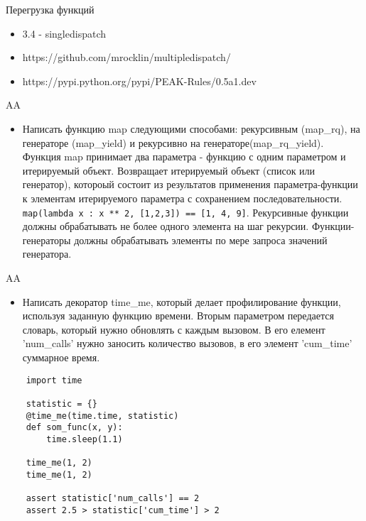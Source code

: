 \documentclass{article}
\begin{document}
\begin{center} Перегрузка функций \end{center}
\begin{itemize}
    \item 3.4 - singledispatch
    \item https://github.com/mrocklin/multipledispatch/
    \item https://pypi.python.org/pypi/PEAK-Rules/0.5a1.dev
\end{itemize}
\newpage

\begin{center} AA \end{center}
\begin{itemize}
    \item Написать функцию map следующими способами: рекурсивным (map\_rq),
        на генераторе (map\_yield) и рекурсивно на генераторе(map\_rq\_yield).
        Функция map принимает два параметра - функцию с одним параметром и итерируемый объект.
        Возвращает итерируемый объект (список или генератор), котороый состоит из результатов
        применения параметра-функции к элементам итерируемого параметра с сохранением последовательности.
        \lstinline!map(lambda x : x ** 2, [1,2,3]) == [1, 4, 9]!.
        Рекурсивные функции должны обрабатывать не более одного элемента на шаг рекурсии.
        Функции-генераторы должны обрабатывать элементы по мере запроса значений генератора.
\end{itemize}
\newpage

\begin{center} AA \end{center}
\begin{itemize}
    \item Написать декоратор time\_me, который делает профилирование функции,
        используя заданную функцию времени. Вторым параметром передается словарь,
        который нужно обновлять с каждым вызовом. В его елемент 'num\_calls' нужно
        заносить количество вызовов, в его элемент 'cum\_time' суммарное время.
\end{itemize}
\vspace{15pt}
\begin{lstlisting}
    import time

    statistic = {}
    @time_me(time.time, statistic)
    def som_func(x, y):
        time.sleep(1.1)

    time_me(1, 2)
    time_me(1, 2)

    assert statistic['num_calls'] == 2
    assert 2.5 > statistic['cum_time'] > 2
\end{lstlisting}
\newpage
\end{document}
